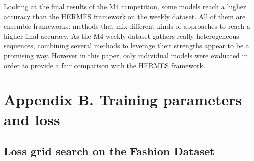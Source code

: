 \documentclass[review]{elsarticle}
\begin{document}
Looking at the final results of the M4 competition, some models reach a higher accuracy than the HERMES framework on the weekly dataset. All of them are ensemble frameworks: methods that mix different kinds of approaches to reach a higher final accuracy. As the M4 weekly dataset gathers really heterogeneous sequences, combining several methods to leverage their strengths appear to be a promising way. However in this paper, only individual models were evaluated in order to provide a fair comparison with the HERMES framework.

\section*{Appendix B. Training parameters and loss}


\subsection{Loss grid search on the Fashion Dataset}
\label{sec:heuritechgridsearch}
\end{document}
